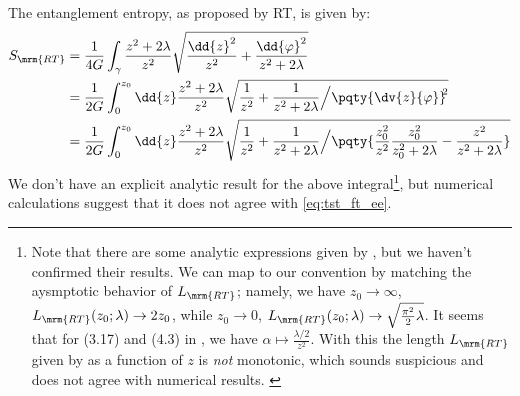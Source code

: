 \documentclass[a4paper
	,10pt
]{article}
\begin{document}
	The entanglement entropy, as proposed by RT, is given by:
	\begin{equation}
	\begin{aligned}
	  S_\mrm{RT}
	  &= \frac{1}{4G} \int_\gamma
	    \frac{z^2 + 2\lambda}{z^2}
	    \sqrt{
	        \frac{\dd{z}^2}{z^2}
	        + \frac{\dd{\varphi}^2}{z^2 + 2\lambda}
	    } \\
	  &= \frac{1}{2G} \int_0^{z_0} \dd{z}
	    \frac{z^2 + 2\lambda}{z^2}
	      \sqrt{
	          \frac{1}{z^2}
	          + \frac{1}{z^2 + 2\lambda}
	          \Big/
	          \pqty{\dv{z}{\varphi}}^{\!\!2}
	      } \\
	  &= \frac{1}{2G} \int_0^{z_0} \dd{z}
	    \frac{z^2 + 2\lambda}{z^2}
	      \sqrt{
	          \frac{1}{z^2}
	          + \frac{1}{z^2 + 2\lambda}
	          \Big/
	          \pqty{
					\frac{z_0^2}{z^2}
					\frac{z_0^2}{z_0^2 + 2\lambda}
					- \frac{z^2}{z^2 + 2\lambda}
	          }
	      }
	\end{aligned}
	\label{eq:RT_integral}
	\end{equation}
	We don't have an explicit analytic result for the above integral\footnote{
		Note that there are some analytic expressions given by \cite{Asrat:2019end}, but we haven't confirmed their results. 
		We can map \cite{Asrat:2019end} to our convention by matching the aysmptotic behavior of $L_\mrm{RT}$; namely, we have $z_0 \to \infty$, $L_\mrm{RT}(z_0;\lambda)\to 2z_0$, while $z_0 \to 0$, $L_\mrm{RT}(z_0;\lambda)\to \sqrt{\frac{\pi^2}{2} \lambda}$. It seems that for (3.17) and (4.3) in \cite{Asrat:2019end}, we have $
			\alpha \mapsto \frac{\lambda/2}{z^2}
		$. With this the length $L_\mrm{RT}$ given by \cite{Asrat:2019end} as a function of $z$ is \textit{not} monotonic, which sounds suspicious and does not agree with numerical results. \label{foot:asrat_matching}
	},
	but numerical calculations suggest that it does not agree with \eqref{eq:tst_ft_ee}. 
	
\pagebreak[3]
	
\end{document}
